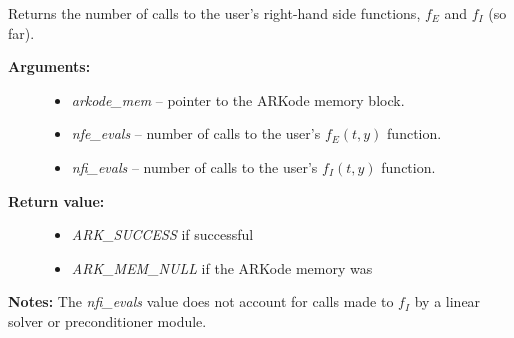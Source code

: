 \documentclass[letterpaper,10pt,english]{sphinxmanual}
\begin{document}
\begin{fulllineitems}
\label{c_interface/User_callable:ARKodeGetNumRhsEvals}
Returns the number of calls to the user's right-hand
side functions, $f_E$ and $f_I$ (so far).
\begin{description}
\item[{\textbf{Arguments:}}] \leavevmode\begin{itemize}
\item {} 
\emph{arkode\_mem} -- pointer to the ARKode memory block.

\item {} 
\emph{nfe\_evals} -- number of calls to the user's $f_E(t,y)$ function.

\item {} 
\emph{nfi\_evals} -- number of calls to the user's $f_I(t,y)$ function.

\end{itemize}

\item[{\textbf{Return value:}}] \leavevmode\begin{itemize}
\item {} 
\emph{ARK\_SUCCESS} if successful

\item {} 
\emph{ARK\_MEM\_NULL} if the ARKode memory was 

\end{itemize}

\end{description}

\textbf{Notes:} The \emph{nfi\_evals} value does not account for calls made to
$f_I$ by a linear solver or preconditioner module.

\end{fulllineitems}

\end{document}
